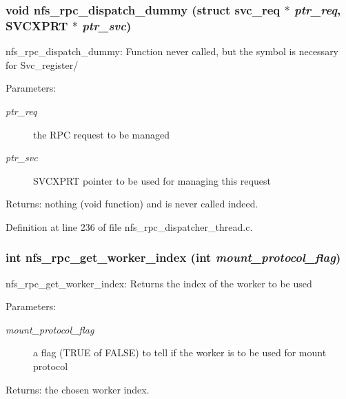 \subsubsection[{nfs\_\-rpc\_\-dispatch\_\-dummy}]{\setlength{\rightskip}{0pt plus 5cm}void nfs\_\-rpc\_\-dispatch\_\-dummy (struct svc\_\-req $\ast$ {\em ptr\_\-req}, \/  SVCXPRT $\ast$ {\em ptr\_\-svc})}\label{nfs__rpc__dispatcher__thread_8c_545ee47faf1c9d08baa979e98749ef42}


nfs\_\-rpc\_\-dispatch\_\-dummy: Function never called, but the symbol is necessary for Svc\_\-register/

\begin{Desc}
\item[Parameters:]
\begin{description}
\item[{\em ptr\_\-req}]the RPC request to be managed \item[{\em ptr\_\-svc}]SVCXPRT pointer to be used for managing this request\end{description}
\end{Desc}
\begin{Desc}
\item[Returns:]nothing (void function) and is never called indeed. \end{Desc}


Definition at line 236 of file nfs\_\-rpc\_\-dispatcher\_\-thread.c.
\subsubsection[{nfs\_\-rpc\_\-get\_\-worker\_\-index}]{\setlength{\rightskip}{0pt plus 5cm}int nfs\_\-rpc\_\-get\_\-worker\_\-index (int {\em mount\_\-protocol\_\-flag})}\label{nfs__rpc__dispatcher__thread_8c_a3184c183d980c407420c2157f36c390}


nfs\_\-rpc\_\-get\_\-worker\_\-index: Returns the index of the worker to be used

\begin{Desc}
\item[Parameters:]
\begin{description}
\item[{\em mount\_\-protocol\_\-flag}]a flag (TRUE of FALSE) to tell if the worker is to be used for mount protocol\end{description}
\end{Desc}
\begin{Desc}
\item[Returns:]the chosen worker index. \end{Desc}


